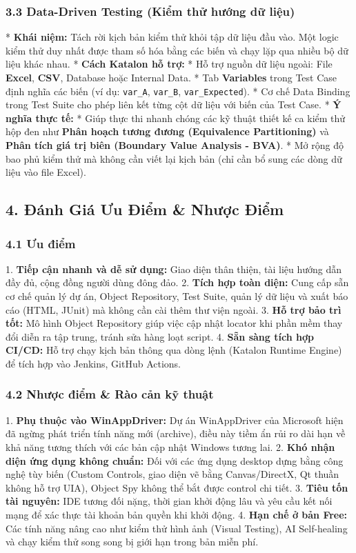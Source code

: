 {\subsubsection{3.3 Data-Driven Testing (Kiểm thử hướng dữ liệu)}
* \textbf{Khái niệm:} Tách rời kịch bản kiểm thử khỏi tập dữ liệu đầu vào. Một logic kiểm thử duy nhất được tham số hóa bằng các biến và chạy lặp qua nhiều bộ dữ liệu khác nhau.
* \textbf{Cách Katalon hỗ trợ:}
  * Hỗ trợ nguồn dữ liệu ngoài: File \textbf{Excel}, \textbf{CSV}, Database hoặc Internal Data.
  * Tab \textbf{Variables} trong Test Case định nghĩa các biến (ví dụ: \texttt{var_A}, \texttt{var_B}, \texttt{var_Expected}).
  * Cơ chế Data Binding trong Test Suite cho phép liên kết từng cột dữ liệu với biến của Test Case.
* \textbf{Ý nghĩa thực tế:}
  * Giúp thực thi nhanh chóng các kỹ thuật thiết kế ca kiểm thử hộp đen như \textbf{Phân hoạch tương đương (Equivalence Partitioning)} và \textbf{Phân tích giá trị biên (Boundary Value Analysis - BVA)}.
  * Mở rộng độ bao phủ kiểm thử mà không cần viết lại kịch bản (chỉ cần bổ sung các dòng dữ liệu vào file Excel).


\subsection{4. Đánh Giá Ưu Điểm \& Nhược Điểm}

\subsubsection{4.1 Ưu điểm}
1. \textbf{Tiếp cận nhanh và dễ sử dụng:} Giao diện thân thiện, tài liệu hướng dẫn đầy đủ, cộng đồng người dùng đông đảo.
2. \textbf{Tích hợp toàn diện:} Cung cấp sẵn cơ chế quản lý dự án, Object Repository, Test Suite, quản lý dữ liệu và xuất báo cáo (HTML, JUnit) mà không cần cài thêm thư viện ngoài.
3. \textbf{Hỗ trợ bảo trì tốt:} Mô hình Object Repository giúp việc cập nhật locator khi phần mềm thay đổi diễn ra tập trung, tránh sửa hàng loạt script.
4. \textbf{Sẵn sàng tích hợp CI/CD:} Hỗ trợ chạy kịch bản thông qua dòng lệnh (Katalon Runtime Engine) để tích hợp vào Jenkins, GitHub Actions.

\subsubsection{4.2 Nhược điểm \& Rào cản kỹ thuật}
1. \textbf{Phụ thuộc vào WinAppDriver:} Dự án WinAppDriver của Microsoft hiện đã ngừng phát triển tính năng mới (archive), điều này tiềm ẩn rủi ro dài hạn về khả năng tương thích với các bản cập nhật Windows tương lai.
2. \textbf{Khó nhận diện ứng dụng không chuẩn:} Đối với các ứng dụng desktop dựng bằng công nghệ tùy biến (Custom Controls, giao diện vẽ bằng Canvas/DirectX, Qt thuần không hỗ trợ UIA), Object Spy không thể bắt được control chi tiết.
3. \textbf{Tiêu tốn tài nguyên:} IDE tương đối nặng, thời gian khởi động lâu và yêu cầu kết nối mạng để xác thực tài khoản bản quyền khi khởi động.
4. \textbf{Hạn chế ở bản Free:} Các tính năng nâng cao như kiểm thử hình ảnh (Visual Testing), AI Self-healing và chạy kiểm thử song song bị giới hạn trong bản miễn phí.


}
